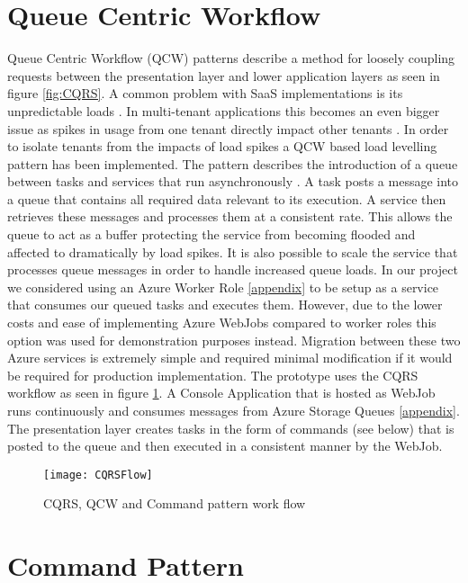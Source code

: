  
 \section{Queue Centric Workflow}
 
 Queue Centric Workflow (QCW) patterns describe a method for loosely coupling requests between the presentation layer and lower application layers as seen in figure \ref{fig:CQRS}. A common problem with SaaS implementations is its unpredictable loads \cite{Swanson}. In multi-tenant applications this becomes an even bigger issue as spikes in usage from one tenant directly impact other tenants \cite{Betts2012-ad}. In order to isolate tenants from the impacts of load spikes a QCW based load levelling pattern has been implemented. The pattern describes the introduction of a queue between tasks and services that run asynchronously \cite{Wilder2012-so}. A task posts a message into a queue that contains all required data relevant to its execution. A service then retrieves these messages and processes them at a consistent rate. This allows the queue to act as a buffer protecting the service from becoming flooded and affected to dramatically by load spikes.
It is also possible to scale the service that processes queue messages in order to handle increased queue loads. In our project we considered using an Azure Worker Role \ref{appendix} to be setup as a service that consumes our queued tasks and executes them. However, due to the lower costs and ease of implementing Azure WebJobs compared to worker roles this option was used for demonstration purposes instead. Migration between these two Azure services is extremely simple and required minimal modification if it would be required for production implementation. The prototype uses the CQRS workflow as seen in figure \ref{fig:CQRSFlow}. A Console Application that is hosted as WebJob runs continuously and consumes messages from Azure Storage Queues \ref{appendix}. The presentation layer creates tasks in the form of commands (see below) that is posted to the queue and then executed in a consistent manner by the WebJob.
 
\begin{figure}
\centering
\texttt{[image: CQRSFlow]}
\caption{CQRS, QCW and Command pattern work flow}
\label{fig:CQRSFlow}
\end{figure}
 
 
 \section{Command Pattern}
 
